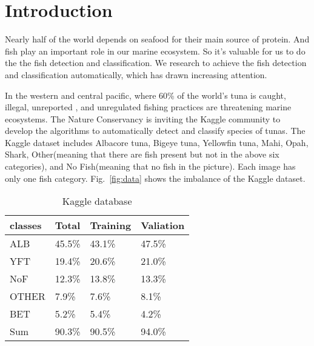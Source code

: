 \documentclass[conference]{IEEEtran}
\begin{document}





\section{Introduction}



Nearly half of the world depends on seafood for their main source of protein. And fish play an important role in our marine ecosystem. So it's valuable for us to do the the fish detection and classification. We research to achieve the fish detection and classification automatically, which has drawn increasing attention.\par
In the western and central pacific, where 60\% of the world's tuna is caught, illegal, unreported , and unregulated fishing practices are threatening marine ecosystems. The Nature Conservancy is inviting the Kaggle community to develop the algorithms to automatically detect and classify species of tunas. The Kaggle dataset includes Albacore tuna, Bigeye tuna, Yellowfin tuna, Mahi, Opah, Shark, Other(meaning that there are fish present but not in the above six categories), and No Fish(meaning that no fish in the picture). Each image has only one fish category. Fig.~\ref{fig:data} shows the imbalance of the Kaggle dataset. 

\begin{table}[t]
  \caption{Kaggle database}
  \label{table:table1}
  \centering
  \begin{tabular}{llll}
    \toprule
    \cmidrule{1-4}
    classes     & Total     & Training   &Valiation \\
    \hline
    ALB & 45.5\%  & 43.1\%  & 47.5\%     \\
    YFT     & 19.4\% & 20.6\%   &21.0\%    \\
    NoF     & 12.3\%   & 13.8\% &13.3\% \\
    OTHER & 7.9\% & 7.6\% & 8.1\% \\
    BET & 5.2\% & 5.4\% & 4.2\% \\ 
    \toprule 
    Sum & 90.3\% & 90.5\% & 94.0\% \\  
    \bottomrule
  \end{tabular}
\end{table}
\end{document}
